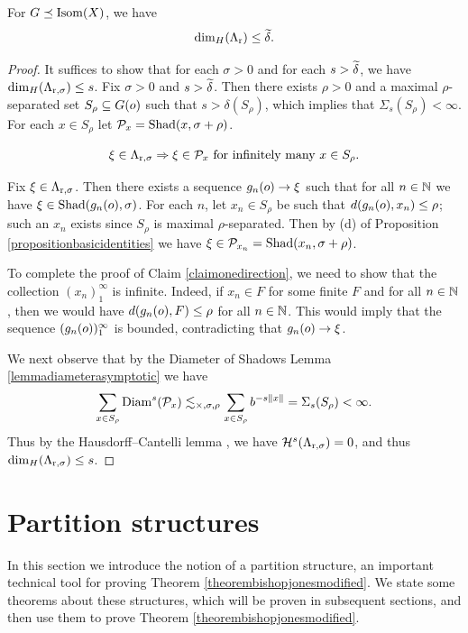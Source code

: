 \begin{lemma}
\label{lemmaonedirection}
For $G\preceq\operatorname{Isom}(X)$, we have
\[
{\dim_H}(\Lambda_{\mathrm r})\leq \widetilde\delta.
\]
\end{lemma}
\begin{proof}
It suffices to show that for each $\sigma > 0$ and for each $s > \widetilde\delta$, we have ${\dim_H}(\Lambda_{\mathrm r,\sigma})\leq s$. Fix $\sigma > 0$ and $s > \widetilde\delta$. Then there exists $\rho > 0$ and a maximal $\rho$-separated set $S_\rho \subseteq G(o)$ such that $s > \delta(S_\rho)$, which implies that $\Sigma_s(S_\rho) < \infty$. For each $x\in S_\rho$ let $\mathcal P_x = \operatorname{Shad}(x,\sigma + \rho)$.
\begin{claim}
\label{claimonedirection}
\[
\xi\in \Lambda_{\mathrm r,\sigma} \Rightarrow \xi\in \mathcal P_x\textup{ for infinitely many }x\in S_\rho.
\]
\end{claim}
\begin{subproof}
Fix $\xi\in\Lambda_{\mathrm r,\sigma}$. Then there exists a sequence $g_n(o)\to\xi$ such that for all $n\in\N$ we have $\xi\in \operatorname{Shad}(g_n(o),\sigma)$. For each $n$, let $x_n\in S_\rho$ be such that $d(g_n(o),x_n)\leq \rho$; such an $x_n$ exists since $S_\rho$ is maximal $\rho$-separated. Then by (d) of Proposition \ref{propositionbasicidentities} we have $\xi\in \mathcal P_{x_n} = \operatorname{Shad}(x_n,\sigma + \rho)$.

To complete the proof of Claim \ref{claimonedirection}, we need to show that the collection $(x_n)_1^\infty$ is infinite. Indeed, if $x_n\in F$ for some finite $F$ and for all $n\in\N$, then we would have $d(g_n(o),F)\leq\rho$ for all $n\in\N$. This would imply that the sequence $(g_n(o))_1^\infty$ is bounded, contradicting that $g_n(o)\to\xi$.
\end{subproof}
We next observe that by the Diameter of Shadows Lemma \ref{lemmadiameterasymptotic} we have
\[
\sum_{x\in S_\rho}\operatorname{Diam}^s(\mathcal P_x)
\lesssim_{\times,\sigma,\rho} \sum_{x\in S_\rho}b^{-s\|x\|}
= \Sigma_s(S_\rho) < \infty.
\]
Thus by the Hausdorff--Cantelli lemma \cite[Lemma 3.10]{BernikDodson}, we have $\mathcal H^s(\Lambda_{\mathrm r,\sigma}) = 0$, and thus ${\dim_H}(\Lambda_{\mathrm r,\sigma})\leq s$.
\end{proof}


\section{Partition structures} \label{subsectionpartitionstructures}
In this section we introduce the notion of a partition structure, an important technical tool for proving Theorem \ref{theorembishopjonesmodified}. We state some theorems about these structures, which will be proven in subsequent sections, and then use them to prove Theorem \ref{theorembishopjonesmodified}.

